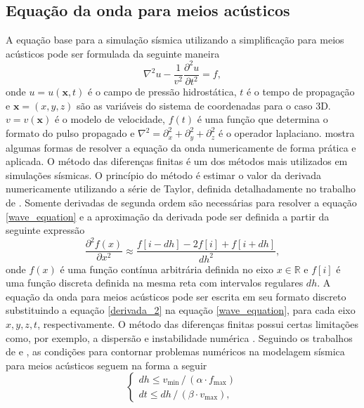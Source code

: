 \subsection{Equação da onda para meios acústicos}

A equação base para a simulação sísmica utilizando a simplificação para meios acústicos pode ser formulada da seguinte maneira
\begin{equation}
	\nabla^2u - \dfrac{1}{v^2}\dfrac{\partial^2u}{\partial t^2} = f,	
	\label{wave_equation}
\end{equation}
\noindent onde $u = u(\mathbf{x},t)$ é o campo de pressão hidrostática, $t$ é o tempo de propagação e $\mathbf{x} = (x,y,z)$ são as variáveis do sistema de coordenadas para o caso 3D. $v = v(\mathbf{x})$ é o modelo de velocidade, $f(t)$ é uma função que determina o formato do pulso propagado e $\nabla^2 = \partial^2_x + \partial^2_y + \partial^2_z$ é o operador laplaciano.  mostra algumas formas de resolver a equação da onda numericamente de forma prática e aplicada. O método das diferenças finitas é um dos métodos mais utilizados em simulações sísmicas. O princípio do método é estimar o valor da derivada numericamente utilizando a série de Taylor, definida detalhadamente no trabalho de . Somente derivadas de segunda ordem são necessárias para resolver a equação \ref{wave_equation} e a aproximação da derivada pode ser definida a partir da seguinte expressão
\begin{equation}
	\dfrac{\partial^2 f(x)}{\partial x^2} \approx \dfrac{f[i - dh] - 2f[i] + f[i + dh]}{dh^2},
	\label{derivada_2}
\end{equation}    
\noindent onde $f(x)$ é uma função contínua arbitrária definida no eixo $x \in \mathbb{R}$ e $f[i]$ é uma função discreta definida na mesma reta com intervalos regulares $dh$. A equação da onda para meios acústicos pode ser escrita em seu formato discreto  substituindo a equação \ref{derivada_2} na equação \ref{wave_equation}, para cada eixo $x,y,z,t$, respectivamente. O método das diferenças finitas possui certas limitações como, por exemplo, a dispersão e instabilidade numérica \cite{aki1980quantitative}. Seguindo os trabalhos de  e , as condições para contornar problemas numéricos na modelagem sísmica para meios acústicos seguem na forma a seguir
\begin{equation}
	\begin{cases}
		dh \le v_{\text{min}} \,/\, (\alpha \cdot f_{\text{max}}) \\
		dt \le dh \,/\, (\beta \cdot v_{\text{max}}),
	\end{cases}
\end{equation}   
